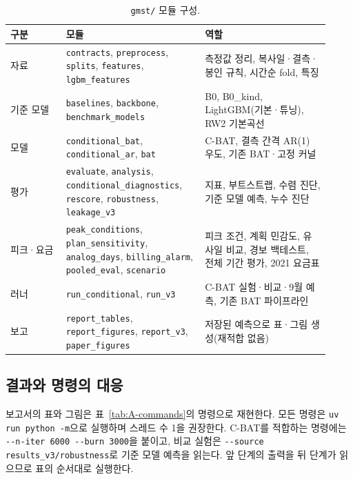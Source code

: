 \begin{table}[h]
\centering
\caption{\texttt{gmst/} 모듈 구성.}
\label{tab:A-modules}
\small
\begin{tabular}{p{0.16\linewidth}p{0.4\linewidth}p{0.36\linewidth}}
\toprule
구분 & 모듈 & 역할 \\
\midrule
자료 & \texttt{contracts}, \texttt{preprocess}, \texttt{splits}, \texttt{features}, \texttt{lgbm\_features} & 측정값 정리, 복사일·결측·봉인 규칙, 시간순 fold, 특징 \\
기준 모델 & \texttt{baselines}, \texttt{backbone}, \texttt{benchmark\_models} & B0, B0\_kind, LightGBM(기본·튜닝), RW2 기본곡선 \\
모델 & \texttt{conditional\_bat}, \texttt{conditional\_ar}, \texttt{bat} & C-BAT, 결측 간격 AR(1) 우도, 기존 BAT·고정 커널 \\
평가 & \texttt{evaluate}, \texttt{analysis}, \texttt{conditional\_diagnostics}, \texttt{rescore}, \texttt{robustness}, \texttt{leakage\_v3} & 지표, 부트스트랩, 수렴 진단, 기준 모델 예측, 누수 진단 \\
피크·요금 & \texttt{peak\_conditions}, \texttt{plan\_sensitivity}, \texttt{analog\_days}, \texttt{billing\_alarm}, \texttt{pooled\_eval}, \texttt{scenario} & 피크 조건, 계획 민감도, 유사일 비교, 경보 백테스트, 전체 기간 평가, 2021 요금표 \\
러너 & \texttt{run\_conditional}, \texttt{run\_v3} & C-BAT 실험·비교·9월 예측, 기존 BAT 파이프라인 \\
보고 & \texttt{report\_tables}, \texttt{report\_figures}, \texttt{report\_v3}, \texttt{paper\_figures} & 저장된 예측으로 표·그림 생성(재적합 없음) \\
\bottomrule
\end{tabular}
\end{table}

\subsection{결과와 명령의 대응}

보고서의 표와 그림은 표~\ref{tab:A-commands}의 명령으로 재현한다. 모든 명령은 \texttt{uv run python -m}으로 실행하며 스레드 수 1을 권장한다. C-BAT를 적합하는 명령에는 \texttt{-{}-n-iter 6000 -{}-burn 3000}을 붙이고, 비교 실험은 \texttt{-{}-source results\_v3/robustness}로 기준 모델 예측을 읽는다. 앞 단계의 출력을 뒤 단계가 읽으므로 표의 순서대로 실행한다.

